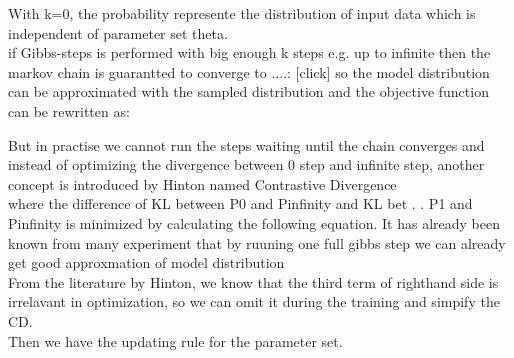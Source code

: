 \begin{frame}
 With k=0, the probability represente the distribution of input data which is independent of parameter set theta.\\
 if Gibbs-steps is performed with big enough k steps e.g. up to infinite then the markov chain is guarantted to converge to ....:
 [click]
 so the model distribution can be approximated with the sampled distribution and the objective function can be rewritten as:
\end{frame}
\begin{frame}
 But in practise we cannot run the steps waiting until the chain converges and instead of optimizing the divergence between 0 step and infinite step, another concept is introduced by Hinton named Contrastive Divergence\\
where the difference of KL between P0 and Pinfinity and KL bet . . P1 and Pinfinity is minimized by calculating the following equation. It has already been known from many experiment that by ruuning one full gibbs step we can already get good approxmation of model distribution\\
From the literature by Hinton, we know that the third term of righthand side is irrelavant in optimization, so we can omit it during the training and simpify the CD.\\
Then we have the updating rule for the parameter set. 
\end{frame}

